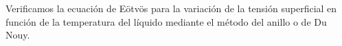 Verificamos la ecuación de Eötvös para la variación de la tensión superficial en función de la temperatura del líquido mediante el método del anillo o de Du Nouy.